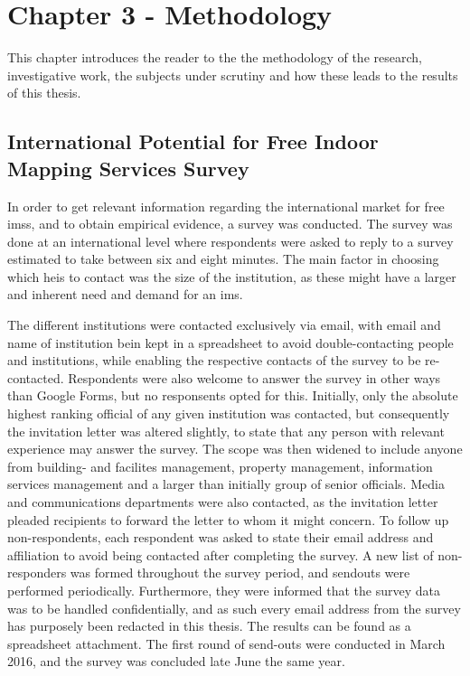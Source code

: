 \chapter{Chapter 3 - Methodology}
This chapter introduces the reader to the the methodology of the research, investigative work, the subjects under scrutiny and how these leads to the results of this thesis.

\section{International Potential for Free Indoor Mapping Services Survey}
In order to get relevant information regarding the international market for free \glspl{ims}, and to obtain empirical evidence, a survey was conducted. The survey was done at an international level where respondents were asked to reply to a survey estimated to take between six and eight minutes. The main factor in choosing which \glspl{hei} to contact was the size of the institution, as these might have a larger and inherent need and demand for an \gls{ims}. 


The different institutions were contacted exclusively via email, with email and name of institution bein kept in a spreadsheet to avoid double-contacting people and institutions, while enabling the respective contacts of the survey to be re-contacted. Respondents were also welcome to answer the survey in other ways than Google Forms, but no responsents opted for this. Initially, only the absolute highest ranking official of any given institution was contacted, but consequently the invitation letter was altered slightly, to state that any person with relevant experience may answer the survey. The scope was then widened to include anyone from building- and facilites management, property management, information services management and a larger than initially group of senior officials. Media and communications departments were also contacted, as the invitation letter pleaded recipients to forward the letter to whom it might concern. To follow up non-respondents, each respondent was asked to state their email address and affiliation to avoid being contacted after completing the survey. A new list of non-responders was formed throughout the survey period, and sendouts were performed periodically. Furthermore, they were informed that the survey data was to be handled confidentially, and as such every email address from the survey has purposely been redacted in this thesis. The results can be found as a spreadsheet attachment. The first round of send-outs were conducted in March 2016, and the survey was concluded late June the same year. 

